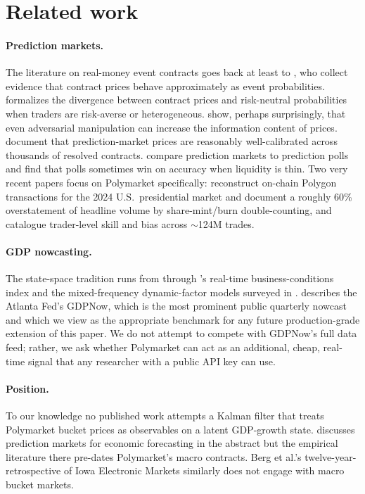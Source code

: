\documentclass{article}
\begin{document}
\section{Related work}
\label{sec:related}

\paragraph{Prediction markets.} The literature on real-money event contracts goes back at
least to \citet{wolfers2004prediction}, who collect evidence that contract prices behave
approximately as event probabilities. \citet{manski2006interpreting} formalizes the
divergence between contract prices and risk-neutral probabilities when traders are
risk-averse or heterogeneous. \citet{hanson2009manipulator} show, perhaps surprisingly, that
even adversarial manipulation can increase the information content of prices.
\citet{page2013well} document that prediction-market prices are reasonably well-calibrated
across thousands of resolved contracts.  \citet{atanasov2017distilling} compare prediction
markets to prediction polls and find that polls sometimes win on accuracy when liquidity is
thin. Two very recent papers focus on Polymarket specifically:
\citet{tsang2026anatomy} reconstruct on-chain Polygon transactions for the 2024 U.S.\
presidential market and document a roughly 60\% overstatement of headline volume by
share-mint/burn double-counting, and \citet{reichenbach2025polymarket} catalogue trader-level
skill and bias across $\sim$124M trades.

\paragraph{GDP nowcasting.} The state-space tradition runs from \citet{stock2002macroeconomic}
through \citet{aruoba2009realtime}'s real-time business-conditions index and the
mixed-frequency dynamic-factor models surveyed in \citet{banbura2013nowcasting}.
\citet{higgins2014gdpnow} describes the Atlanta Fed's GDPNow, which is the most prominent
public quarterly nowcast and which we view as the appropriate benchmark for any future
production-grade extension of this paper. We do not attempt to compete with GDPNow's full
data feed; rather, we ask whether Polymarket can act as an additional, cheap, real-time
signal that any researcher with a public API key can use.

\paragraph{Position.} To our knowledge no published work attempts a Kalman filter that
treats Polymarket bucket prices as observables on a latent GDP-growth state. \citet{snowberg2013prediction}
discusses prediction markets for economic forecasting in the abstract but the empirical
literature there pre-dates Polymarket's macro contracts. Berg et al.'s
twelve-year-retrospective of Iowa Electronic Markets \citep{berg2008results} similarly does
not engage with macro bucket markets.\nocite{berg2008results}\nocite{tetlock2007giving}
\end{document}
